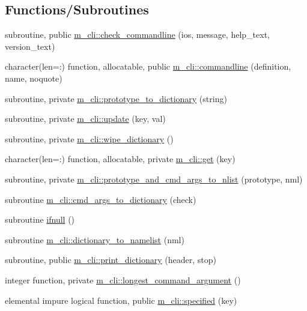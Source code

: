\subsection*{Functions/\+Subroutines}
\begin{DoxyCompactItemize}
\item 
subroutine, public \mbox{\hyperlink{namespacem__cli_a62056f0c153eb63cb0b11a21edb028cd}{m\+\_\+cli\+::check\+\_\+commandline}} (ios, message, help\+\_\+text, version\+\_\+text)
\item 
character(len=\+:) function, allocatable, public \mbox{\hyperlink{namespacem__cli_a4f639b0c4bf16930fc1c5858ed4196a3}{m\+\_\+cli\+::commandline}} (definition, name, noquote)
\item 
subroutine, private \mbox{\hyperlink{namespacem__cli_a8c62537a2d224364c9cb30005be819e9}{m\+\_\+cli\+::prototype\+\_\+to\+\_\+dictionary}} (string)
\item 
subroutine, private \mbox{\hyperlink{namespacem__cli_a9b7676d796e5cb878ecd9294b8a689cb}{m\+\_\+cli\+::update}} (key, val)
\item 
subroutine, private \mbox{\hyperlink{namespacem__cli_a3c1b30406fc692841826be979726bb1b}{m\+\_\+cli\+::wipe\+\_\+dictionary}} ()
\item 
character(len=\+:) function, allocatable, private \mbox{\hyperlink{namespacem__cli_a45783c194a1484042f63c58b180ca8df}{m\+\_\+cli\+::get}} (key)
\item 
subroutine, private \mbox{\hyperlink{namespacem__cli_ac77d70573b34ade2079cc4004a6acba5}{m\+\_\+cli\+::prototype\+\_\+and\+\_\+cmd\+\_\+args\+\_\+to\+\_\+nlist}} (prototype, nml)
\item 
subroutine \mbox{\hyperlink{namespacem__cli_a89a63254465b02048f09541e51974764}{m\+\_\+cli\+::cmd\+\_\+args\+\_\+to\+\_\+dictionary}} (check)
\item 
subroutine \mbox{\hyperlink{M__CLI_8f90_aa26f90016621d1ee43d3b5b66316532b}{ifnull}} ()
\item 
subroutine \mbox{\hyperlink{namespacem__cli_a7e5041efcad56387232475a3ae728634}{m\+\_\+cli\+::dictionary\+\_\+to\+\_\+namelist}} (nml)
\item 
subroutine, public \mbox{\hyperlink{namespacem__cli_a5b6abaf1d5aec5e918be0759df29c849}{m\+\_\+cli\+::print\+\_\+dictionary}} (header, stop)
\item 
integer function, private \mbox{\hyperlink{namespacem__cli_aaf5504d3b48696a9d22fa5773c5a7d15}{m\+\_\+cli\+::longest\+\_\+command\+\_\+argument}} ()
\item 
elemental impure logical function, public \mbox{\hyperlink{namespacem__cli_a3822e3acc1d6ae296f9f27a83cc1ca23}{m\+\_\+cli\+::specified}} (key)

\end{DoxyCompactItemize}
